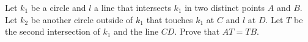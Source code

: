 Let $k_1$ be a circle and $l$ a line that intersects $k_1$ in two distinct points $A$ and $B$.
Let $k_2$ be another circle outside of $k_1$ that touches $k_1$ at $C$ and $l$ at $D$.
Let $T$ be the second intersection of $k_1$ and the line $CD$.
Prove that $AT=TB$.
